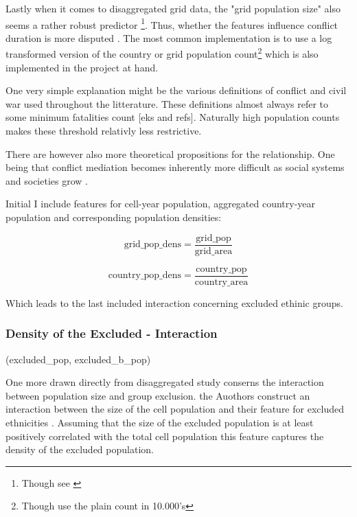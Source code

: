 \documentclass[a4paper]{article}
\begin{document}
Lastly when it comes to disaggregated grid data, the "grid population size" also seems a rather robust predictor \citep{Buhaug_2010, Cederman_Gleditsch_Buhaug_2013}\footnote{Though see \cite{Hegre_Oestby_Raleigh_2009}}. Thus, whether the features influence conflict duration is more disputed \citep{Collier_Hoeffler_1998, Fearon_2004}. The most common implementation is to use a log transformed version of the country or grid population count\footnote{Though \cite{Collier_Hoeffler_1998} use the plain count in 10.000's} which is also implemented in the project at hand.\par


One very simple explanation might be the various definitions of conflict and civil war used throughout the litterature. These definitions almost always refer to some minimum fatalities count [eks and refs]. Naturally high population counts makes these threshold relativly less restrictive.\par

There are however also more theoretical propositions for the relationship. One being that conflict mediation becomes inherently more difficult as social systems and societies grow \cite[p- 271-272]{Diamond_1998}.\par

Initial I include features for cell-year population, aggregated country-year population and corresponding population densities:

$$\textrm{grid\_pop\_dens} = \frac{\textrm{grid\_pop}}{\textrm{grid\_area}}$$

$$\textrm{country\_pop\_dens} = \frac{\textrm{country\_pop}}{\textrm{country\_area}}$$

Which leads to the last included interaction concerning excluded ethinic groups.\par 

\subsubsection{Density of the Excluded - Interaction} %

(excluded\_pop, excluded\_b\_pop) 

One more drawn directly from \cite{Cederman_Gleditsch_Buhaug_2013} disaggregated study conserns the interaction between population size and group exclusion. the Auothors construct an interaction between the size of the cell population and their feature for excluded ethnicities \citep[73-78]{Cederman_Gleditsch_Buhaug_2013}. Assuming that the size of the excluded population is at least positively correlated with the total cell population this feature captures the density of the excluded population. 
\end{document}

